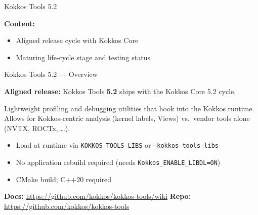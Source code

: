 
\begin{frame}[fragile]

  {\Huge Kokkos Tools 5.2}

  \vspace{15pt}

  \textbf{Content:}
  \begin{itemize}
    \item Aligned release cycle with Kokkos Core
    \item Maturing life-cycle stage and testing status
  \end{itemize}

\end{frame}


\begin{frame}[fragile]{Kokkos Tools 5.2 --- Overview}

  \textbf{Aligned release:} Kokkos Tools \textbf{5.2} ships with the Kokkos Core 5.2 cycle.

  \vspace{8pt}

  Lightweight profiling and debugging utilities that hook into the Kokkos runtime.
  Allows for Kokkos-centric analysis (kernel labels, Views) vs.\ vendor tools alone (NVTX, ROCTx, \ldots).

  \vspace{8pt}

  \begin{itemize}
    \item Load at runtime via \texttt{KOKKOS\_TOOLS\_LIBS} or \texttt{--kokkos-tools-libs}
    \item No application rebuild required (needs \texttt{Kokkos\_ENABLE\_LIBDL=ON})
    \item CMake build; C++20 required
  \end{itemize}

  \vspace{6pt}

  \textbf{Docs:} \url{https://github.com/kokkos/kokkos-tools/wiki}
  \newline
  \textbf{Repo:} \url{https://github.com/kokkos/kokkos-tools}

\end{frame}

